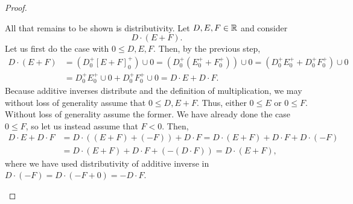 \begin{thm}
\begin{proof}
\begin{savenotes}
All that remains to be shown is distributivity.  Let $D,E,F\in \mathbb{R}$ and consider
\begin{equation}
D\cdot (E+F).
\end{equation}
Let us first do the case with $0\leq D,E,F$.  Then, by the previous step,
\begin{equation}
\begin{split}
D\cdot (E+F) & =\left( D_0^+[E+F]_0^+\right) \cup 0=\left( D_0^+(E_0^++F_0^+)\right) \cup 0=\left( D_0^+E_0^++D_0^+F_0^+\right) \cup 0 \\
& =D_0^+E_0^+\cup 0+D_0^+F_0^+\cup 0=D\cdot E+D\cdot F.
\end{split}
\end{equation}
Because additive inverses distribute and the definition of multiplication, we may without loss of generality assume that $0\leq D,E+F$.  Thus, either $0\leq E$ or $0\leq F$.  Without loss of generality assume the former.  We have already done the case $0\leq F$, so let us instead assume that $F<0$.  Then,
\begin{equation}
\begin{split}
D\cdot E+D\cdot F & =D\cdot \left( (E+F)+(-F)\right) +D\cdot F=D\cdot (E+F)+D\cdot F+D\cdot (-F) \\
& =D\cdot (E+F)+D\cdot F+\left( -(D\cdot F)\right) =D\cdot (E+F),
\end{split}
\end{equation}
where we have used distributivity of additive inverse in $D\cdot (-F)=D\cdot (-F+0)=-D\cdot F$.


\end{savenotes}
\end{proof}
\end{thm}
